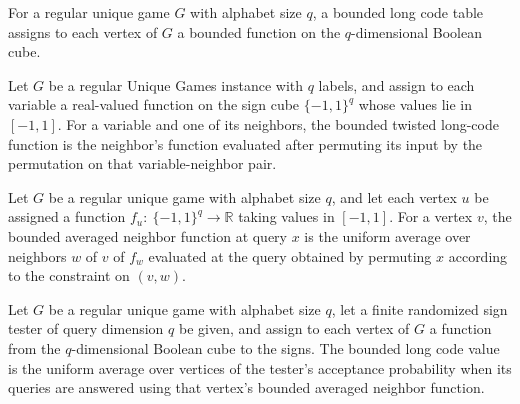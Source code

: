\begin{definition}
\label{FABL.RegularUniqueGame.BoundedLongCodeTable}
\leanok
{}
For a regular unique game $G$ with alphabet size $q$, a bounded long code table assigns
to each vertex of $G$ a bounded function on the $q$-dimensional Boolean cube.
\end{definition}

\begin{definition}
\label{FABL.RegularUniqueGame.boundedTwistedLongCode}
\leanok
{}
Let $G$ be a regular Unique Games instance with $q$ labels, and assign to each variable
a real-valued function on the sign cube $\{-1,1\}^q$ whose values lie in $[-1,1]$. For
a variable and one of its neighbors, the bounded twisted long-code function is the
neighbor's function evaluated after permuting its input by the permutation on that
variable-neighbor pair.
\end{definition}

\begin{definition}
\label{FABL.RegularUniqueGame.boundedAveragedNeighborFunction}
\leanok
{}
Let $G$ be a regular unique game with alphabet size $q$, and let each vertex $u$ be
assigned a function $f_u:\
\{−1,1\}^q\to\mathbb R$ taking values in $[-1,1]$. For a vertex $v$, the bounded
averaged neighbor function at query $x$ is the uniform average over neighbors $w$ of $v$
of $f_w$ evaluated at the query obtained by permuting $x$ according to the constraint on
$(v,w)$.
\end{definition}

\begin{definition}
\label{FABL.RegularUniqueGame.boundedLongCodeValue}
\leanok
{}
Let $G$ be a regular unique game with alphabet size $q$, let a finite randomized sign
tester of query dimension $q$ be given, and assign to each vertex of $G$ a function from
the $q$-dimensional Boolean cube to the signs. The bounded long code value is the
uniform average over vertices of the tester's acceptance probability when its queries
are answered using that vertex's bounded averaged neighbor function.
\end{definition}

